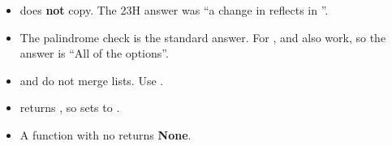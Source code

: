 \begin{traps}
\begin{itemize}
  \item {} does \textbf{not} copy. The 23H answer was ``a change in  reflects in ''.
  \item The palindrome check  is the standard answer. For ,  and  also work, so the answer is ``All of the options''.
  \item {} and  do not merge lists. Use .
  \item {} returns , so  sets  to .
  \item A function with no  returns \textbf{None}.
\end{itemize}
\end{traps}
